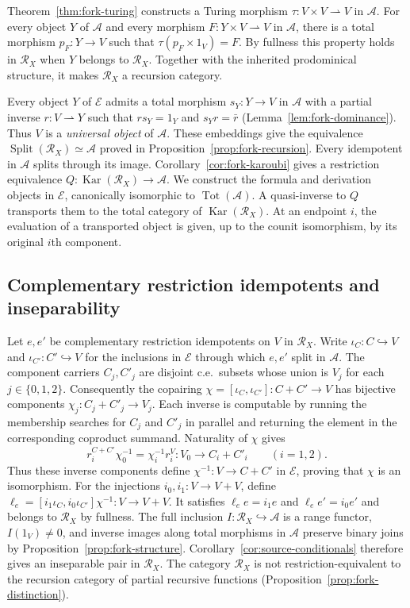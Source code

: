 Theorem~\ref{thm:fork-turing} constructs a Turing morphism
$\tau:V\times V\rightharpoonup V$ in $\mathcal A$.
For every object $Y$ of $\mathcal A$ and every morphism
$F:Y\times V\rightharpoonup V$ in $\mathcal A$, there is a
total morphism $p_F:Y\to V$ such that $\tau(p_F\times1_V)=F$.
By fullness this property holds in $\mathscr R_X$ when
$Y$ belongs to $\mathscr R_X$. Together with the inherited
prodominical structure, it makes $\mathscr R_X$ a recursion category.

Every object $Y$ of $\mathcal E$ admits a total morphism $s_Y:Y\to V$ in
$\mathcal A$ with a partial inverse $r:V\rightharpoonup Y$
such that $r s_Y=1_Y$ and $s_Y r=\bar r$
(Lemma~\ref{lem:fork-dominance}). Thus $V$ is a
\emph{universal object} of $\mathcal A$.
These embeddings give the equivalence
$\operatorname{Split}(\mathscr R_X)\simeq\mathcal A$
proved in Proposition~\ref{prop:fork-recursion}.
Every idempotent in $\mathcal A$ splits through its image.
Corollary~\ref{cor:fork-karoubi} gives a restriction equivalence
$Q:\operatorname{Kar}(\mathscr R_X)\to\mathcal A$. We construct the
formula and derivation objects in $\mathcal E$, canonically isomorphic to
$\operatorname{Tot}(\mathcal A)$.
A quasi-inverse to $Q$ transports them to the total category of
$\operatorname{Kar}(\mathscr R_X)$. At an endpoint $i$, the evaluation
of a transported object is given, up to the counit isomorphism, by
its original $i$th component.

\subsection{Complementary restriction idempotents and inseparability}
\label{subsec:fork-complementary-domains}

Let $e,e'$ be complementary restriction idempotents on $V$ in
$\mathscr R_X$. Write $\iota_C:C\hookrightarrow V$ and
$\iota_{C'}:C'\hookrightarrow V$ for the inclusions in $\mathcal E$
through which $e,e'$ split in $\mathcal A$.
The component carriers $C_j,C'_j$ are disjoint c.e.\ subsets whose union
is $V_j$ for each $j\in\{0,1,2\}$. Consequently the copairing
$\chi=[\iota_C,\iota_{C'}]:C+C'\to V$ has bijective components
$\chi_j:C_j+C'_j\to V_j$. Each inverse is
computable by running the membership searches for $C_j$ and $C'_j$ in
parallel and returning the element in the corresponding coproduct
summand. Naturality of $\chi$ gives
\[
 r_i^{C+C'}\chi_0^{-1}=\chi_i^{-1}r_i^V:V_0\longrightarrow C_i+C'_i
 \qquad(i=1,2).
\]
Thus these inverse components define $\chi^{-1}:V\to C+C'$ in
$\mathcal E$, proving that $\chi$ is an isomorphism.
For the injections $i_0,i_1:V\to V+V$, define
$\ell_e=[i_1\iota_C,i_0\iota_{C'}]\chi^{-1}:V\to V+V$.
It satisfies $\ell_e e=i_1e$ and $\ell_e e'=i_0e'$ and belongs to
$\mathscr R_X$ by fullness. The full inclusion
$I:\mathscr R_X\hookrightarrow\mathcal A$ is a range functor,
$I(1_V)\ne0$, and inverse images along total morphisms in $\mathcal A$ preserve
binary joins by Proposition~\ref{prop:fork-structure}.
Corollary~\ref{cor:source-conditionals} therefore gives an inseparable
pair in $\mathscr R_X$.
The category $\mathscr R_X$ is not restriction-equivalent to the
recursion category of partial recursive functions
(Proposition~\ref{prop:fork-distinction}).

